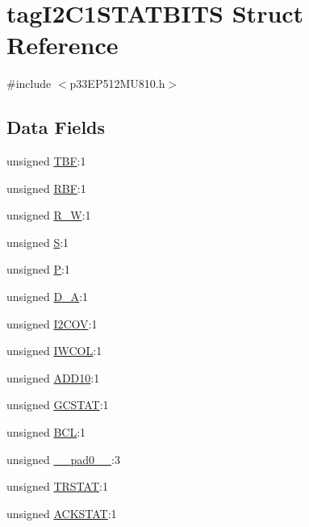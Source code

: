 \hypertarget{structtag_i2_c1_s_t_a_t_b_i_t_s}{}\section{tag\+I2\+C1\+S\+T\+A\+T\+B\+I\+TS Struct Reference}
\label{structtag_i2_c1_s_t_a_t_b_i_t_s}


{\ttfamily \#include $<$p33\+E\+P512\+M\+U810.\+h$>$}

\subsection*{Data Fields}
\begin{DoxyCompactItemize}
\item 
unsigned \hyperlink{structtag_i2_c1_s_t_a_t_b_i_t_s_a2cc28964983ef17d96cf9e2230c5df82}{T\+BF}\+:1
\item 
unsigned \hyperlink{structtag_i2_c1_s_t_a_t_b_i_t_s_a2a122c4acd2f697495e96c0339681673}{R\+BF}\+:1
\item 
unsigned \hyperlink{structtag_i2_c1_s_t_a_t_b_i_t_s_abfd46c8176d9ae8afba1de4e4e0be703}{R\+\_\+W}\+:1
\item 
unsigned \hyperlink{structtag_i2_c1_s_t_a_t_b_i_t_s_a144c5a43162033ca0ba61e313283eed8}{S}\+:1
\item 
unsigned \hyperlink{structtag_i2_c1_s_t_a_t_b_i_t_s_a805106850ead18446c151e2c6b76f992}{P}\+:1
\item 
unsigned \hyperlink{structtag_i2_c1_s_t_a_t_b_i_t_s_ac64d8520a04a591aebca9ddaf19c4c33}{D\+\_\+A}\+:1
\item 
unsigned \hyperlink{structtag_i2_c1_s_t_a_t_b_i_t_s_a7ec41682da03f9233113b5d0814261e2}{I2\+C\+OV}\+:1
\item 
unsigned \hyperlink{structtag_i2_c1_s_t_a_t_b_i_t_s_a89f19265fe046252142c93c690df6f69}{I\+W\+C\+OL}\+:1
\item 
unsigned \hyperlink{structtag_i2_c1_s_t_a_t_b_i_t_s_aa91b39587cc9aca4d68fec2d99702a07}{A\+D\+D10}\+:1
\item 
unsigned \hyperlink{structtag_i2_c1_s_t_a_t_b_i_t_s_a1afb6549d7ce979283e5013aebe9f5cc}{G\+C\+S\+T\+AT}\+:1
\item 
unsigned \hyperlink{structtag_i2_c1_s_t_a_t_b_i_t_s_acead45594aa9d4a55a37f37fdcc3f0a0}{B\+CL}\+:1
\item 
unsigned \hyperlink{structtag_i2_c1_s_t_a_t_b_i_t_s_adf71f3d8410c1f1dbbc96680a92c49af}{\+\_\+\+\_\+pad0\+\_\+\+\_\+}\+:3
\item 
unsigned \hyperlink{structtag_i2_c1_s_t_a_t_b_i_t_s_ab0728a3da8f26dbbebc4740b6b4c3531}{T\+R\+S\+T\+AT}\+:1
\item 
unsigned \hyperlink{structtag_i2_c1_s_t_a_t_b_i_t_s_a696033ba403a9897eb7d8b480bea697d}{A\+C\+K\+S\+T\+AT}\+:1
\end{DoxyCompactItemize}


